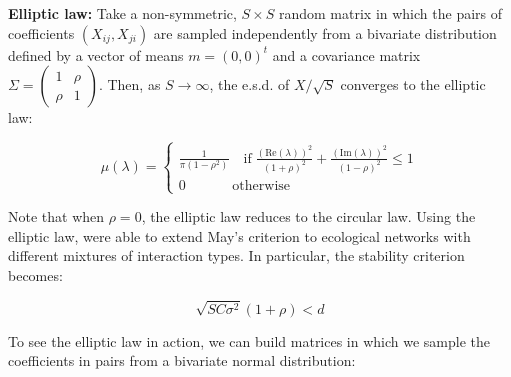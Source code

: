 \documentclass[]{book}
\begin{document}
\textbf{Elliptic law:} Take a non-symmetric, \(S \times S\) random matrix in which the pairs of coefficients \((X_{ij}, X_{ji})\) are sampled independently from a bivariate distribution defined by a vector of means \(m = (0,0)^t\) and a covariance matrix \(\Sigma = \begin{pmatrix} 1 & \rho\\ \rho & 1 \end{pmatrix}\). Then, as \(S \to \infty\), the e.s.d. of \({X} / \sqrt{S}\) converges to the elliptic law:

\[
  \mu(\lambda) = \begin{cases} \frac{1}{\pi (1 - \rho^2) } \quad
    \text{if} \; \frac{(\text{Re}(\lambda))^2}{(1 + \rho)^2} +
    \frac{(\text{Im}(\lambda))^2}{(1 -\rho)^2} \leq
    1\\ 0 \quad \quad \quad \text{ otherwise}
  \end{cases}
\]

Note that when \(\rho = 0\), the elliptic law reduces to the circular law. Using the elliptic law, \citet{allesina2012stability} were able to extend May's criterion to ecological networks with different mixtures of interaction types. In particular, the stability criterion becomes:

\[
\sqrt{S C \sigma^2}(1 + \rho) < d
\]

To see the elliptic law in action, we can build matrices in which we sample the coefficients in pairs from a bivariate normal distribution:
\end{document}
